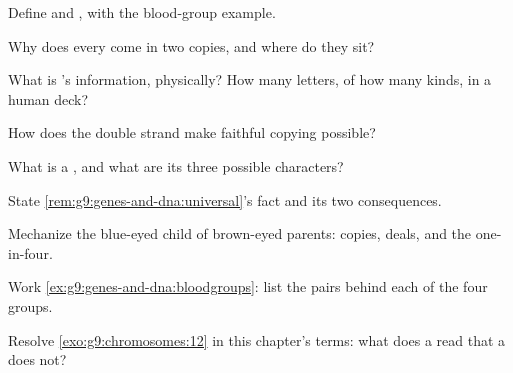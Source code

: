 \begin{exercise}[$\star$]\label{exo:g9:genes-and-dna:1}
Define  and , with the blood-group example.
\end{exercise}

\begin{exercise}[$\star$]\label{exo:g9:genes-and-dna:2}
Why does every  come in two copies, and where do they
sit?
\end{exercise}

\begin{exercise}[$\star$]\label{exo:g9:genes-and-dna:3}
What is 's information, physically? How many letters,
of how many kinds, in a human deck?
\end{exercise}

\begin{exercise}[$\star$]\label{exo:g9:genes-and-dna:4}
How does the double strand make faithful copying
possible?
\end{exercise}

\begin{exercise}[$\star$]\label{exo:g9:genes-and-dna:5}
What is a , and what are its three possible
characters?
\end{exercise}

\begin{exercise}[$\star$]\label{exo:g9:genes-and-dna:6}
State \cref{rem:g9:genes-and-dna:universal}'s fact and
its two consequences.
\end{exercise}

\begin{exercise}[$\star\star$]\label{exo:g9:genes-and-dna:7}
Mechanize the blue-eyed child of brown-eyed parents:
copies, deals, and the one-in-four.
\end{exercise}

\begin{exercise}[$\star\star$]\label{exo:g9:genes-and-dna:8}
Work \cref{ex:g9:genes-and-dna:bloodgroups}: list the
 pairs behind each of the four groups.
\end{exercise}

\begin{exercise}[$\star\star$]\label{exo:g9:genes-and-dna:9}
Resolve \cref{exo:g9:chromosomes:12} in this chapter's
terms: what does a  read that a   does
not?
\end{exercise}

